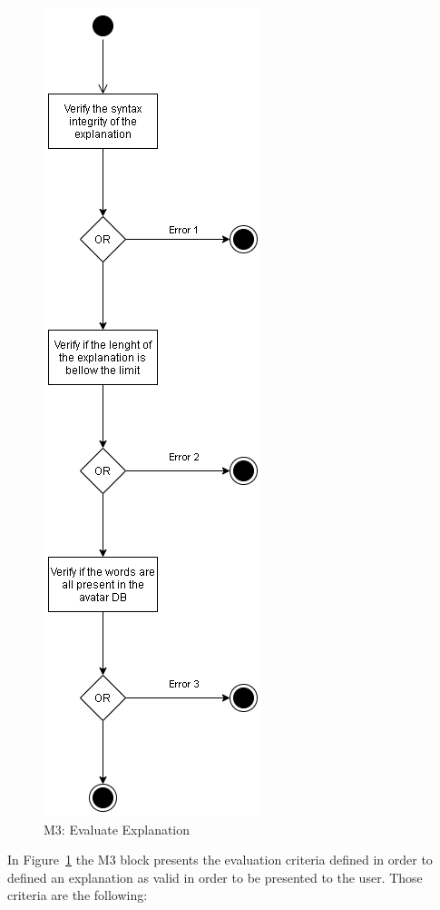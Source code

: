 \begin{figure}[H]
\centering
\includegraphics[scale=0.5]{ch4/assets/M3.png}
\caption[Evaluate Explanation Module]{M3: Evaluate Explanation}
\label{fig:M3}
\end{figure}

In Figure~\ref{fig:M3} the M3 block presents the evaluation criteria defined in order to defined an explanation as valid in order to be presented to the user.
Those criteria are the following:

